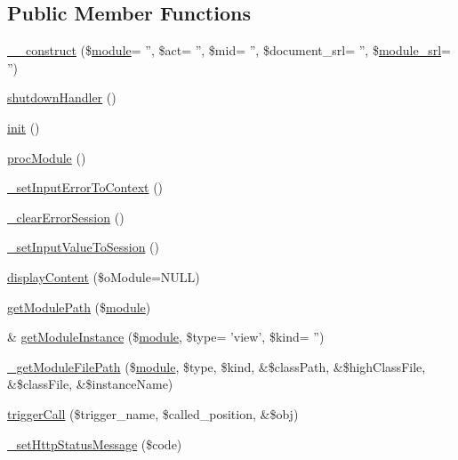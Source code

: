 \subsection*{Public Member Functions}
\begin{DoxyCompactItemize}
\item 
\hyperlink{classModuleHandler_aa04a9dbd59a9f64d62260227cdf18acd}{\-\_\-\-\_\-construct} (\$\hyperlink{classmodule}{module}= '', \$act= '', \$mid= '', \$document\-\_\-srl= '', \$\hyperlink{ko_8install_8php_a370bb6450fab1da3e0ed9f484a38b761}{module\-\_\-srl}= '')
\item 
\hyperlink{classModuleHandler_a6295c502e315baa6c563f48ddf08e233}{shutdown\-Handler} ()
\item 
\hyperlink{classModuleHandler_a4a4671c196a893207c38af84c8ee7da8}{init} ()
\item 
\hyperlink{classModuleHandler_a74ad0ae3090eff1da5a6e0e68ce431d0}{proc\-Module} ()
\item 
\hyperlink{classModuleHandler_aa47d0ccb069d65698ade6f44bf6c705f}{\-\_\-set\-Input\-Error\-To\-Context} ()
\item 
\hyperlink{classModuleHandler_a45c91a72acccf3ee8139538ef5aa1c1d}{\-\_\-clear\-Error\-Session} ()
\item 
\hyperlink{classModuleHandler_ab3837506079a320e2726079777bb2b3e}{\-\_\-set\-Input\-Value\-To\-Session} ()
\item 
\hyperlink{classModuleHandler_a140c43faf30dedf139212294e3e9acf3}{display\-Content} (\$o\-Module=N\-U\-L\-L)
\item 
\hyperlink{classModuleHandler_a0a175bdc5034df0bf4ce66ea0e6e1bf2}{get\-Module\-Path} (\$\hyperlink{classmodule}{module})
\item 
\& \hyperlink{classModuleHandler_aea2e4d82f816ee25ec97ce2c830e6860}{get\-Module\-Instance} (\$\hyperlink{classmodule}{module}, \$type= 'view', \$kind= '')
\item 
\hyperlink{classModuleHandler_a75e1eb90149d7f6e38cfd5dc7a9521d4}{\-\_\-get\-Module\-File\-Path} (\$\hyperlink{classmodule}{module}, \$type, \$kind, \&\$class\-Path, \&\$high\-Class\-File, \&\$class\-File, \&\$instance\-Name)
\item 
\hyperlink{classModuleHandler_aa1b1f9eae91ccd76e6a81c9375c2e673}{trigger\-Call} (\$trigger\-\_\-name, \$called\-\_\-position, \&\$obj)
\item 
\hyperlink{classModuleHandler_a91c14051caea99153975f2335a2dc770}{\-\_\-set\-Http\-Status\-Message} (\$code)
\end{DoxyCompactItemize}

